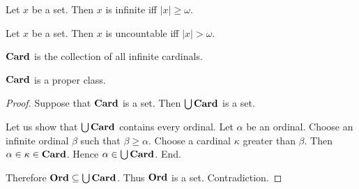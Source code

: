 \documentclass[../set-theory.tex]{subfiles}
\begin{document}
  \begin{forthel}
    \begin{proposition}
      Let $x$ be a set.
      Then $x$ is infinite iff $|x| \geq \omega$.
    \end{proposition}
  \end{forthel}

  \begin{forthel}
    \begin{proposition}
      Let $x$ be a set.
      Then $x$ is uncountable iff $|x| > \omega$.
    \end{proposition}
  \end{forthel}

  \begin{forthel}
    \begin{definition}
      $\mathbf{Card}$ is the collection of all infinite cardinals.
    \end{definition}
  \end{forthel}

  \begin{forthel}
    \begin{proposition}
      $\mathbf{Card}$ is a proper class.
    \end{proposition}
    \begin{proof}
      Suppose that $\mathbf{Card}$ is a set.
      Then $\bigcup \mathbf{Card}$ is a set.

      Let us show that $\bigcup \mathbf{Card}$ contains every ordinal.
        Let $\alpha$ be an ordinal.
        Choose an infinite ordinal $\beta$ such that $\beta \geq \alpha$.
        Choose a cardinal $\kappa$ greater than $\beta$.
        Then $\alpha \in \kappa \in \mathbf{Card}$.
        Hence $\alpha \in \bigcup \mathbf{Card}$.
      End.

      Therefore $\mathbf{Ord} \subseteq \bigcup \mathbf{Card}$.
      Thus $\mathbf{Ord}$ is a set.
      Contradiction.
    \end{proof}
  \end{forthel}
\end{document}
